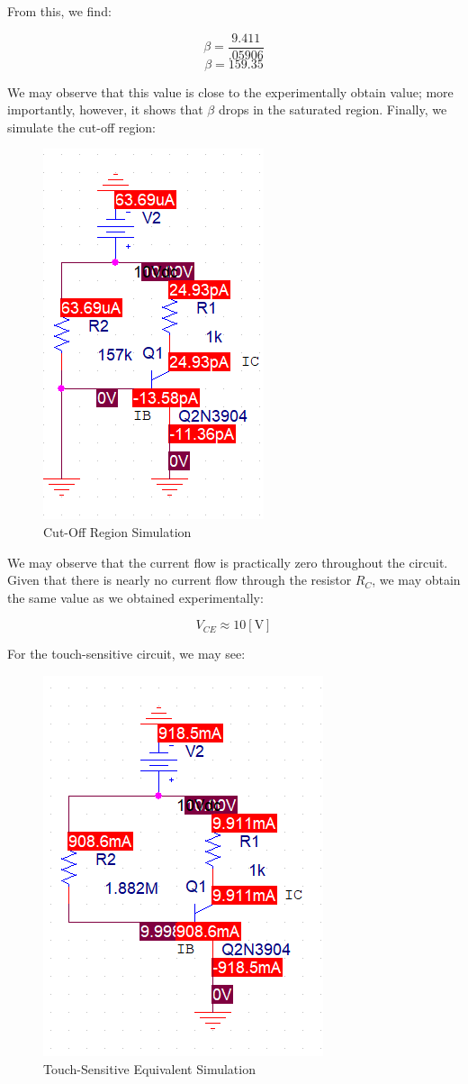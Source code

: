 \documentclass[
	letterpaper, %
	10pt, %
]{CSUniSchoolLabReport}
\begin{document}
From this, we find:

$$\beta=\frac{9.411}{.05906}$$
$$\boxed{\beta=159.35}$$

We may observe that this value is close to the experimentally obtain value; more importantly, however, it shows that $\beta$ drops in the saturated region. Finally, we simulate the cut-off region:

\begin{figure}[H]
  \centering
  \includegraphics[width=.5\textwidth]{Figures/L3F5}
  \caption{Cut-Off Region Simulation}
  \label{fig:9}
\end{figure}

We may observe that the current flow is practically zero throughout the circuit. Given that there is nearly no current flow through the resistor $R_C$, we may obtain the same value as we obtained experimentally:

$$V_{CE}\approx 10[\si{\volt}]$$

For the touch-sensitive circuit, we may see:

\begin{figure}[H]
  \centering
  \includegraphics[width=.5\textwidth]{Figures/L3F6}
  \caption{Touch-Sensitive Equivalent Simulation}
  \label{fig:10}
\end{figure}
\end{document}
